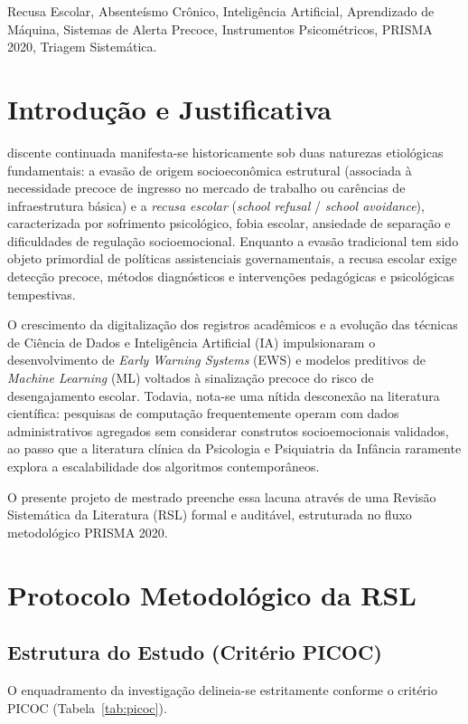 \documentclass[journal,10pt,a4paper]{IEEEtran}
\begin{document}
\begin{IEEEkeywords}
Recusa Escolar, Absenteísmo Crônico, Inteligência Artificial, Aprendizado de Máquina, Sistemas de Alerta Precoce, Instrumentos Psicométricos, PRISMA 2020, Triagem Sistemática.
\end{IEEEkeywords}

\section{Introdução e Justificativa}
 discente continuada manifesta-se historicamente sob duas naturezas etiológicas fundamentais: a evasão de origem socioeconômica estrutural (associada à necessidade precoce de ingresso no mercado de trabalho ou carências de infraestrutura básica) e a \textit{recusa escolar} (\textit{school refusal} / \textit{school avoidance}), caracterizada por sofrimento psicológico, fobia escolar, ansiedade de separação e dificuldades de regulação socioemocional. Enquanto a evasão tradicional tem sido objeto primordial de políticas assistenciais governamentais, a recusa escolar exige detecção precoce, métodos diagnósticos e intervenções pedagógicas e psicológicas tempestivas.

O crescimento da digitalização dos registros acadêmicos e a evolução das técnicas de Ciência de Dados e Inteligência Artificial (IA) impulsionaram o desenvolvimento de \textit{Early Warning Systems} (EWS) e modelos preditivos de \textit{Machine Learning} (ML) voltados à sinalização precoce do risco de desengajamento escolar. Todavia, nota-se uma nítida desconexão na literatura científica: pesquisas de computação frequentemente operam com dados administrativos agregados sem considerar construtos socioemocionais validados, ao passo que a literatura clínica da Psicologia e Psiquiatria da Infância raramente explora a escalabilidade dos algoritmos contemporâneos.

O presente projeto de mestrado preenche essa lacuna através de uma Revisão Sistemática da Literatura (RSL) formal e auditável, estruturada no fluxo metodológico PRISMA 2020.

\section{Protocolo Metodológico da RSL}

\subsection{Estrutura do Estudo (Critério PICOC)}
O enquadramento da investigação delineia-se estritamente conforme o critério PICOC (Tabela~\ref{tab:picoc}).
\end{document}
